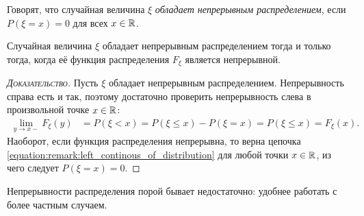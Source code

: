 \documentclass[../main.tex]{subfiles}
\begin{document}
\begin{df}
 Говорят, что случайная величина $\xi$ \textit{обладает непрерывным распределением}, если $P(\xi = x) = 0$ для всех $x \in \mathbb{R}$.
\end{df}

\begin{remrk}
 Случайная величина $ \xi $ обладает непрерывным распределением тогда и только тогда, когда её функция распределения $ F_{\xi} $ является непрерывной.
\end{remrk}
\begin{proof}[\normalfont\textsc{Доказательство}]
 Пусть $ \xi $ обладает непрерывным распределением. Непрерывность справа есть и так, поэтому достаточно проверить непрерывность слева в произвольной точке $ x \in \mathbb{R} $:
 \begin{align}
  \label{equation:remark:left_continous_of_distribution}
  \lim_{y \to x-} F_{\xi}(y) &= P(\xi < x) = P(\xi \leqslant x) - P(\xi = x) = P(\xi \leqslant x) = F_{\xi}(x).
 \end{align} Наоборот, если функция распределения непрерывна, то верна цепочка \eqref{equation:remark:left_continous_of_distribution} для любой точки $ x \in \mathbb{R} $, из чего следует $ P(\xi = x) = 0 $.
\end{proof}

Непрерывности распределения порой бывает недостаточно: удобнее работать с более частным случаем.
\end{document}
